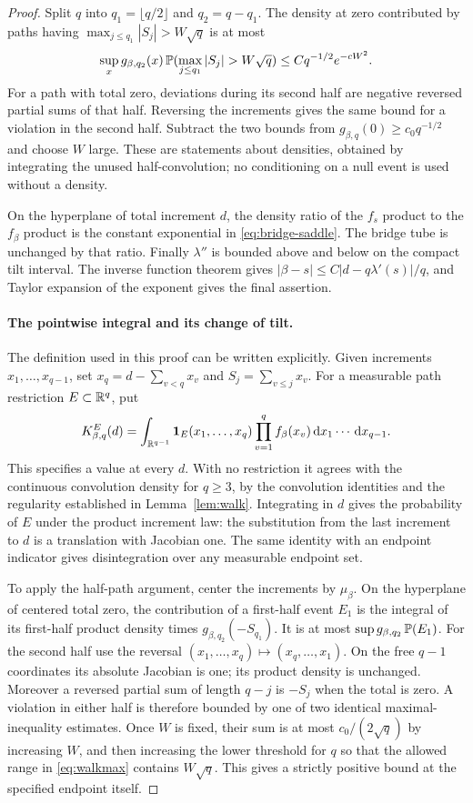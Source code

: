\documentclass[11pt]{article}
\theoremstyle{definition}\newtheorem{definition}[theorem]{Definition}
\theoremstyle{remark}\newtheorem{remark}[theorem]{Remark}
\newcommand{\dd}{\,\mathrm d}\newcommand{\ind}{\mathbf1}
\numberwithin{equation}{section}\allowdisplaybreaks
\begin{document}
\begin{proof}
Split $q$ into $q_1=\lfloor q/2\rfloor$ and $q_2=q-q_1$.
The density at zero contributed by paths having
$\max_{j\le q_1}|S_j|>W\sqrt q$ is at most
\[
 \sup_x g_{\beta,q_2}(x)\,
 \Pp(\max_{j\le q_1}|S_j|>W\sqrt q)
 \le Cq^{-1/2}e^{-cW^2}.
\]
For a path with total zero, deviations during its second half are
negative reversed partial sums of that half. Reversing the increments
gives the same bound for a violation in the second half. Subtract the
two bounds from $g_{\beta,q}(0)\ge c_0q^{-1/2}$ and choose $W$ large.
These are statements about densities, obtained by integrating the unused
half-convolution; no conditioning on a null event is used without a density.

On the hyperplane of total increment $d$, the density ratio of the
$f_s$ product to the $f_\beta$ product is the constant exponential in
\eqref{eq:bridge-saddle}. The bridge tube is unchanged by that ratio.
Finally $\lambda''$ is bounded above and below on the compact tilt
interval. The inverse function theorem gives
$|\beta-s|\le C|d-q\lambda'(s)|/q$, and Taylor expansion of the
exponent gives the final assertion.

\paragraph{The pointwise integral and its change of tilt.}
The definition used in this proof can be written explicitly. Given
increments $x_1,\ldots,x_{q-1}$, set
$x_q=d-\sum_{v<q}x_v$ and $S_j=\sum_{v\le j}x_v$. For a measurable
path restriction $E\subset\mathbb R^q$, put
\[
 K_{\beta,q}^{E}(d)=
 \int_{\R^{q-1}}\ind_E(x_1,\ldots,x_q)
              \prod_{v=1}^q f_\beta(x_v)
                   \dd x_1\cdots\dd x_{q-1}.
\]
This specifies a value at every $d$. With no restriction it agrees
with the continuous convolution density for $q\ge3$, by the
convolution identities and the regularity established in
Lemma~\ref{lem:walk}. Integrating in $d$ gives the probability of
$E$ under the product increment law: the substitution from the
last increment to $d$ is a translation with Jacobian one. The
same identity with an endpoint indicator gives disintegration
over any measurable endpoint set.

To apply the half-path argument, center the increments by
$\mu_\beta$. On the hyperplane of centered total zero, the
contribution of a first-half event $E_1$ is the integral of its
first-half product density times
$g_{\beta,q_2}(-S_{q_1})$. It is at most
$\sup g_{\beta,q_2}\,\mathbb P(E_1)$. For the second half use the reversal
$(x_1,\ldots,x_q)\mapsto(x_q,\ldots,x_1)$. On the free
$q-1$ coordinates its absolute Jacobian is one; its product density
is unchanged. Moreover a reversed partial sum of length $q-j$ is
$-S_j$ when the total is zero. A violation in either half is
therefore bounded by one of two identical maximal-inequality
estimates. Once $W$ is fixed, their sum is at most
$c_0/(2\sqrt q)$ by increasing $W$, and then increasing the lower
threshold for $q$ so that the allowed range in \eqref{eq:walkmax}
contains $W\sqrt q$. This gives a strictly positive bound at the
specified endpoint itself.


\end{proof}
\end{document}
